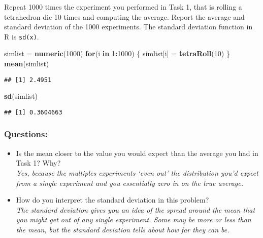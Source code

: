 \documentclass[
]{article}
\newenvironment{Shaded}{\begin{snugshade}}{\end{snugshade}}
\newcommand{\ControlFlowTok}[1]{\textcolor[rgb]{0.13,0.29,0.53}{\textbf{#1}}}
\newcommand{\DecValTok}[1]{\textcolor[rgb]{0.00,0.00,0.81}{#1}}
\newcommand{\KeywordTok}[1]{\textcolor[rgb]{0.13,0.29,0.53}{\textbf{#1}}}
\newcommand{\NormalTok}[1]{#1}
\newcommand{\OperatorTok}[1]{\textcolor[rgb]{0.81,0.36,0.00}{\textbf{#1}}}
\newcommand{\StringTok}[1]{\textcolor[rgb]{0.31,0.60,0.02}{#1}}
\providecommand{\tightlist}{%
  \setlength{\itemsep}{0pt}\setlength{\parskip}{0pt}}
\begin{document}
Repeat 1000 times the experiment you performed in Task 1, that is
rolling a tetrahedron die 10 times and computing the average. Report the
average and standard deviation of the 1000 experiments. The standard
deviation function in R is \texttt{sd(x)}.

\begin{Shaded}
\begin{Highlighting}[]
\NormalTok{simlist =}\StringTok{ }\KeywordTok{numeric}\NormalTok{(}\DecValTok{1000}\NormalTok{)}
\ControlFlowTok{for}\NormalTok{(i }\ControlFlowTok{in} \DecValTok{1}\OperatorTok{:}\DecValTok{1000}\NormalTok{)}
\NormalTok{\{}
\NormalTok{  simlist[i] =}\StringTok{ }\KeywordTok{tetraRoll}\NormalTok{(}\DecValTok{10}\NormalTok{)}
\NormalTok{\}}
\KeywordTok{mean}\NormalTok{(simlist)}
\end{Highlighting}
\end{Shaded}

\begin{verbatim}
## [1] 2.4951
\end{verbatim}

\begin{Shaded}
\begin{Highlighting}[]
\KeywordTok{sd}\NormalTok{(simlist)}
\end{Highlighting}
\end{Shaded}

\begin{verbatim}
## [1] 0.3604663
\end{verbatim}

\hypertarget{questions}{%
\subsubsection{Questions:}\label{questions}}

\begin{itemize}
\tightlist
\item
  Is the mean closer to the value you would expect than the average you
  had in Task 1? Why?\\
  \emph{Yes, because the multiples experiments `even out' the
  distribution you'd expect from a single experiment and you essentially
  zero in on the true average.}
\item
  How do you interpret the standard deviation in this problem?\\
  \emph{The standard deviation gives you an idea of the spread around
  the mean that you might get out of any single experiment. Some may be
  more or less than the mean, but the standard deviation tells about how
  far they can be.}
\end{itemize}
\end{document}

